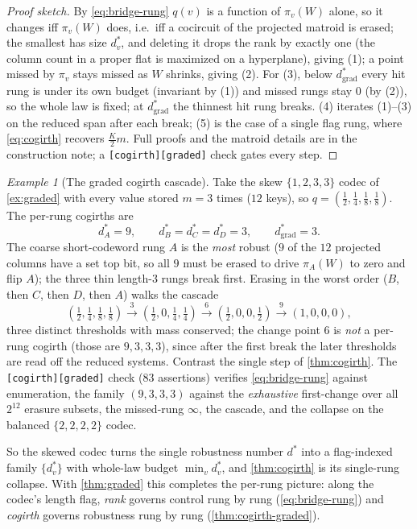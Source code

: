 \documentclass[11pt]{article}
\theoremstyle{definition}
\theoremstyle{plain}
\theoremstyle{remark}
\newtheorem{example}{Example}[section]
\newcommand{\W}{W}                          %
\newcommand{\proj}{\pi}                     %
\begin{document}
\begin{proof}[Proof sketch]
By \eqref{eq:bridge-rung} $q(v)$ is a function of $\proj_v(\W)$ alone, so it changes iff
$\proj_v(\W)$ does, i.e.\ iff a cocircuit of the projected matroid is erased; the smallest
has size $d^\ast_v$, and deleting it drops the rank by exactly one (the column count in a
proper flat is maximized on a hyperplane), giving (1); a point missed by $\proj_v$ stays
missed as $\W$ shrinks, giving (2). For (3), below $d^\ast_{\mathrm{grad}}$ every hit rung is
under its own budget (invariant by (1)) and missed rungs stay $0$ (by (2)), so the whole law
is fixed; at $d^\ast_{\mathrm{grad}}$ the thinnest hit rung breaks. (4) iterates (1)--(3) on
the reduced span after each break; (5) is the case of a single flag rung, where
\eqref{eq:cogirth} recovers $\tfrac{K}{2}m$. Full proofs and the matroid details are in the
construction note; a \texttt{[cogirth][graded]} check gates every step.
\end{proof}

\begin{example}[The graded cogirth cascade]
\label{ex:cogirth-graded}
Take the skew $\{1,2,3,3\}$ codec of \cref{ex:graded} with every value stored $m = 3$ times
($12$ keys), so $q = (\tfrac12,\tfrac14,\tfrac18,\tfrac18)$. The per-rung cogirths are
\[
  d^\ast_A = 9, \qquad d^\ast_B = d^\ast_C = d^\ast_D = 3, \qquad d^\ast_{\mathrm{grad}} = 3.
\]
The coarse short-codeword rung $A$ is the \emph{most} robust ($9$ of the $12$ projected
columns have a set top bit, so all $9$ must be erased to drive $\proj_A(\W)$ to zero and flip
$A$); the three thin length-$3$
rungs break first. Erasing in the worst order ($B$, then $C$, then $D$, then $A$) walks the
cascade
\[
  (\tfrac12,\tfrac14,\tfrac18,\tfrac18)
  \xrightarrow{\;3\;} (\tfrac12, 0, \tfrac14, \tfrac14)
  \xrightarrow{\;6\;} (\tfrac12, 0, 0, \tfrac12)
  \xrightarrow{\;9\;} (1, 0, 0, 0),
\]
three distinct thresholds with mass conserved; the change point $6$ is \emph{not} a per-rung
cogirth (those are $9,3,3,3$), since after the first break the later thresholds are read off
the reduced systems. Contrast the single step of \cref{thm:cogirth}. The
\texttt{[cogirth][graded]} check ($83$ assertions) verifies \eqref{eq:bridge-rung} against
enumeration, the family $(9,3,3,3)$ against the \emph{exhaustive} first-change over all
$2^{12}$ erasure subsets, the missed-rung $\infty$, the cascade, and the collapse on the
balanced $\{2,2,2,2\}$ codec.
\end{example}

So the skewed codec turns the single robustness number $d^\ast$ into a flag-indexed family
$\{d^\ast_v\}$ with whole-law budget $\min_v d^\ast_v$, and \cref{thm:cogirth} is its
single-rung collapse. With \cref{thm:graded} this completes the per-rung picture: along the
codec's length flag, \emph{rank} governs control rung by rung (\eqref{eq:bridge-rung}) and
\emph{cogirth} governs robustness rung by rung (\cref{thm:cogirth-graded}).
\end{document}
